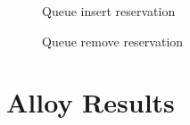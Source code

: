 \begin{figure}[H]
  \label{addInQueue}
  \centering
    \caption{Queue insert reservation}
\end{figure}


\begin{figure}[H]
  \label{deInQueue}
  \centering
    \caption{Queue remove reservation}
\end{figure}

\section{Alloy Results}


